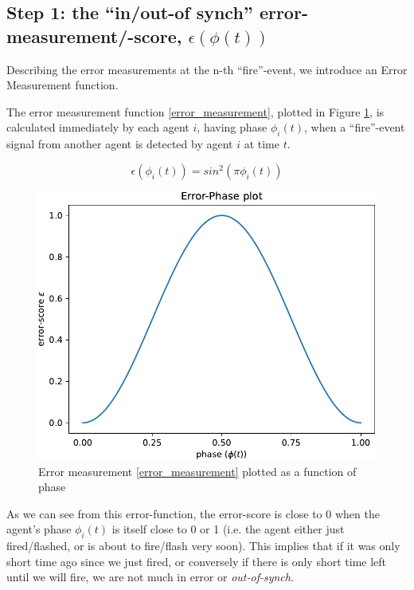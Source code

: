 \subsection{Step 1: the ``in/out-of synch'' error-measurement/-score, $\epsilon(\phi(t))$}

Describing the error measurements at the n-th ``fire''-event, we introduce an Error Measurement function.

The error measurement function \eqref{error_measurement}, plotted in Figure \ref{fig:error_measurement}, is calculated immediately by each agent $i$, having phase $\phi_i(t)$, when a ``fire''-event signal from another agent is detected by agent $i$ at time $t$.

\begin{equation}
\label{error_measurement}
	\epsilon(\phi_i(t)) = sin^2(\pi\phi_i(t))
\end{equation} \nl

\begin{figure}[ht!]
	\centering
	\includegraphics[width=0.65\linewidth]{Assets/Figures/Functions/PhaseErrorFunction.pdf}
	\caption[Plot of error-measurement function for K. Nymoen's frequency-adjustment]{Error measurement \eqref{error_measurement} plotted as a function of phase}
	\label{fig:error_measurement}
\end{figure}

As we can see from this error-function, the error-score is close to 0 when the agent's phase $\phi_i(t)$ is itself close to 0 or 1 (i.e. the agent either just fired/flashed, or is about to fire/flash very soon). This implies that if it was only short time ago since we just fired, or conversely if there is only short time left until we will fire, we are not much in error or \textit{out-of-synch}. 

